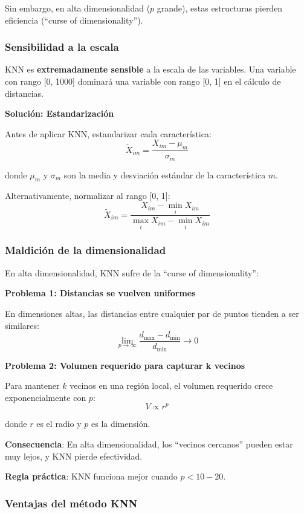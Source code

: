\documentclass[
  doc,
  floatsintext,
  longtable,
  a4paper,
  nolmodern,
  notxfonts,
  notimes,
  12pt,
  colorlinks=true,linkcolor=blue,citecolor=blue,urlcolor=blue]{apa7}
\begin{document}
Sin embargo, en alta dimensionalidad (\(p\) grande), estas estructuras
pierden eficiencia (``curse of dimensionality'').

\subsubsection{Sensibilidad a la escala}\label{sensibilidad-a-la-escala}

KNN es \textbf{extremadamente sensible} a la escala de las variables.
Una variable con rango {[}0, 1000{]} dominará una variable con rango
{[}0, 1{]} en el cálculo de distancias.

\textbf{Solución: Estandarización}

Antes de aplicar KNN, estandarizar cada característica: \[
\tilde{X}_{im} = \frac{X_{im} - \mu_m}{\sigma_m}
\]

donde \(\mu_m\) y \(\sigma_m\) son la media y desviación estándar de la
característica \(m\).

Alternativamente, normalizar al rango {[}0, 1{]}: \[
\tilde{X}_{im} = \frac{X_{im} - \min_i X_{im}}{\max_i X_{im} - \min_i X_{im}}
\]

\subsubsection{Maldición de la
dimensionalidad}\label{maldiciuxf3n-de-la-dimensionalidad}

En alta dimensionalidad, KNN sufre de la ``curse of dimensionality'':

\textbf{Problema 1: Distancias se vuelven uniformes}

En dimensiones altas, las distancias entre cualquier par de puntos
tienden a ser similares: \[
\lim_{p \to \infty} \frac{d_{\max} - d_{\min}}{d_{\min}} \to 0
\]

\textbf{Problema 2: Volumen requerido para capturar k vecinos}

Para mantener \(k\) vecinos en una región local, el volumen requerido
crece exponencialmente con \(p\): \[
V \propto r^p
\]

donde \(r\) es el radio y \(p\) es la dimensión.

\textbf{Consecuencia}: En alta dimensionalidad, los ``vecinos cercanos''
pueden estar muy lejos, y KNN pierde efectividad.

\textbf{Regla práctica}: KNN funciona mejor cuando \(p < 10-20\).

\subsubsection{Ventajas del método
KNN}\label{ventajas-del-muxe9todo-knn}
\end{document}
